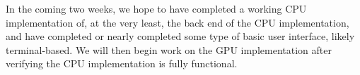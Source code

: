 \documentclass{article}
\begin{document}
In the coming two weeks, we hope to have completed a working CPU implementation of, at the very least, the back end of the CPU implementation, and have completed or nearly completed some type of basic user interface, likely terminal-based. We will then begin work on the GPU implementation after verifying the CPU implementation is fully functional.
\end{document}
